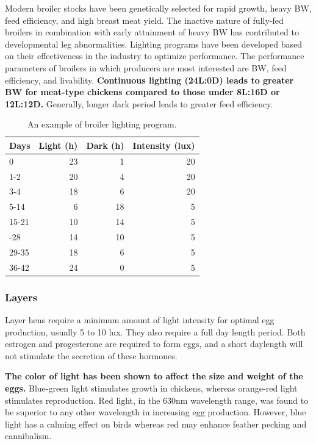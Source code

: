 \documentclass[]{book}
\begin{document}
Modern broiler stocks have been genetically selected for rapid growth,
heavy BW, feed efficiency, and high breast meat yield. The inactive
nature of fully-fed broilers in combination with early attainment of
heavy BW has contributed to developmental leg abnormalities. Lighting
programs have been developed based on their effectiveness in the
industry to optimize performance. The performance parameters of broilers
in which producers are most interested are BW, feed efficiency, and
livability. \textbf{Continuous lighting (24L:0D) leads to greater BW for
meat-type chickens compared to those under 8L:16D or 12L:12D.}
Generally, longer dark period leads to greater feed efficiency.

\begin{table}

\caption{\label{tab:lightening}An example of broiler lighting program.}
\centering
\begin{tabular}[t]{lrrr}
\toprule
Days & Light (h) & Dark (h) & Intensity (lux)\\
\midrule
0 & 23 & 1 & 20\\
1-2 & 20 & 4 & 20\\
3-4 & 18 & 6 & 20\\
5-14 & 6 & 18 & 5\\
15-21 & 10 & 14 & 5\\
\addlinespace
22-28 & 14 & 10 & 5\\
29-35 & 18 & 6 & 5\\
36-42 & 24 & 0 & 5\\
\bottomrule
\end{tabular}
\end{table}

\subsubsection{Layers}\label{layers}

Layer hens require a minimum amount of light intensity for optimal egg
production, usually 5 to 10 lux. They also require a full day length
period. Both estrogen and progesterone are required to form eggs, and a
short daylength will not stimulate the secretion of these hormones.

\textbf{The color of light has been shown to affect the size and weight
of the eggs.} Blue-green light stimulates growth in chickens, whereas
orange-red light stimulates reproduction. Red light, in the 630nm
wavelength range, was found to be superior to any other wavelength in
increasing egg production. However, blue light has a calming effect on
birds whereas red may enhance feather pecking and cannibalism.
\end{document}
